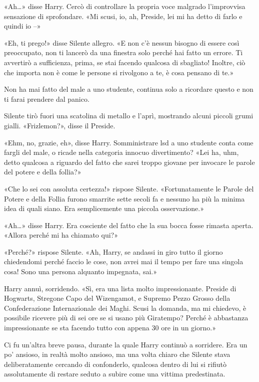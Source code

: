 «Ah…» disse Harry. Cercò di controllare la propria voce malgrado l’improvvisa sensazione di sprofondare. «Mi scusi, io, ah, Preside, lei mi ha detto di farlo e quindi io –»

«Eh, ti prego!» disse Silente allegro. «E non c’è nessun bisogno di essere così preoccupato, non ti lancerò da una finestra solo perché hai fatto un errore. Ti avvertirò a sufficienza, prima, se stai facendo qualcosa di sbagliato! Inoltre, ciò che importa non è come le persone si rivolgono a te, è cosa pensano di te.»

Non ha mai fatto del male a uno studente, continua solo a ricordare questo e non ti farai prendere dal panico.

Silente tirò fuori una scatolina di metallo e l’aprì, mostrando alcuni piccoli grumi gialli. «Frizlemon?», disse il Preside.

«Ehm, no, grazie, eh», disse Harry. Somministrare lsd a uno studente conta come fargli del male, o ricade nella categoria innocuo divertimento? «Lei ha, uhm, detto qualcosa a riguardo del fatto che sarei troppo giovane per invocare le parole del potere e della follia?»

«Che lo sei con assoluta certezza!» rispose Silente. «Fortunatamente le Parole del Potere e della Follia furono smarrite sette secoli fa e nessuno ha più la minima idea di quali siano. Era semplicemente una piccola osservazione.»

«Ah…» disse Harry. Era cosciente del fatto che la sua bocca fosse rimasta aperta. «Allora perché mi ha chiamato qui?»

«Perché?» rispose Silente. «Ah, Harry, se andassi in giro tutto il giorno chiedendomi perché faccio le cose, non avrei mai il tempo per fare una singola cosa! Sono una persona alquanto impegnata, sai.»

Harry annuì, sorridendo. «Sì, era una lista molto impressionante. Preside di Hogwarts, Stregone Capo del Wizengamot, e Supremo Pezzo Grosso della Confederazione Internazionale dei Maghi. Scusi la domanda, ma mi chiedevo, è possibile ricevere più di sei ore se si usano più Giratempo? Perché è abbastanza impressionante se sta facendo tutto con appena 30 ore in un giorno.»

Ci fu un’altra breve pausa, durante la quale Harry continuò a sorridere. Era un po’ ansioso, in realtà molto ansioso, ma una volta chiaro che Silente stava deliberatamente cercando di confonderlo, qualcosa dentro di lui si rifiutò assolutamente di restare seduto a subire come una vittima predestinata.

